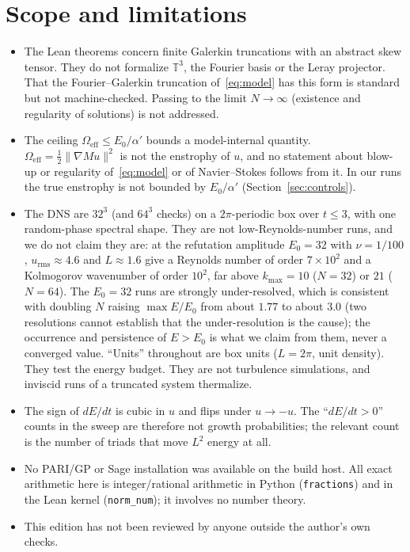\documentclass[11pt,a4paper]{article}
\theoremstyle{definition}
\newcommand{\Eff}{\Omega_{\mathrm{eff}}}
\begin{document}
\section{Scope and limitations}
\label{sec:scope}
\begin{itemize}
  \item The Lean theorems concern finite Galerkin truncations with an abstract skew tensor. They do not formalize $\mathbb{T}^3$, the Fourier basis or the Leray projector. That the Fourier--Galerkin truncation of~\eqref{eq:model} has this form is standard but not machine-checked. Passing to the limit $N\to\infty$ (existence and regularity of solutions) is not addressed.
  \item The ceiling $\Eff\le E_0/\alpha'$ bounds a model-internal quantity. $\Eff=\tfrac12\|\nabla Mu\|^2$ is not the enstrophy of $u$, and no statement about blow-up or regularity of~\eqref{eq:model} or of Navier--Stokes follows from it. In our runs the true enstrophy is not bounded by $E_0/\alpha'$ (Section~\ref{sec:controls}).
  \item The DNS are $32^3$ (and $64^3$ checks) on a $2\pi$-periodic box over $t\le3$, with one random-phase spectral shape. They are not low-Reynolds-number runs, and we do not claim they are: at the refutation amplitude $E_0=32$ with $\nu=1/100$, $u_{\mathrm{rms}}\approx4.6$ and $L\approx1.6$ give a Reynolds number of order $7\times10^2$ and a Kolmogorov wavenumber of order $10^2$, far above $k_{\max}=10$ ($N=32$) or $21$ ($N=64$). The $E_0=32$ runs are strongly under-resolved, which is consistent with doubling $N$ raising $\max E/E_0$ from about $1.77$ to about $3.0$ (two resolutions cannot establish that the under-resolution is the cause); the occurrence and persistence of $E>E_0$ is what we claim from them, never a converged value. ``Units'' throughout are box units ($L=2\pi$, unit density). They test the energy budget. They are not turbulence simulations, and inviscid runs of a truncated system thermalize.
  \item The sign of $dE/dt$ is cubic in $u$ and flips under $u\to-u$. The ``$dE/dt>0$'' counts in the sweep are therefore not growth probabilities; the relevant count is the number of triads that move $L^2$ energy at all.
  \item No PARI/GP or Sage installation was available on the build host. All exact arithmetic here is integer/rational arithmetic in Python (\texttt{fractions}) and in the Lean kernel (\texttt{norm\_num}); it involves no number theory.
  \item This edition has not been reviewed by anyone outside the author's own checks.
\end{itemize}
\end{document}
